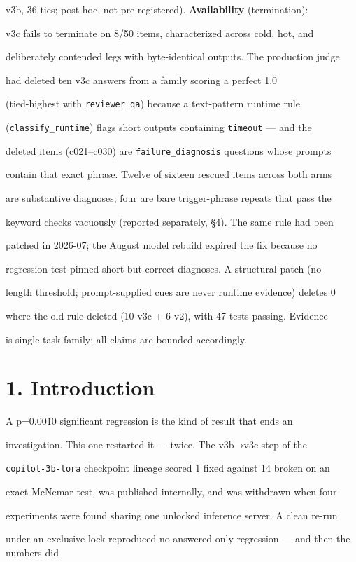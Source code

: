 \documentclass[11pt,a4paper]{article}
\begin{document}
v3b, 36 ties; post-hoc, not pre-registered). \textbf{Availability} (termination):

v3c fails to terminate on 8/50 items, characterized across cold, hot, and

deliberately contended legs with byte-identical outputs. The production judge

had deleted ten v3c answers from a family scoring a perfect 1.0

(tied-highest with \texttt{reviewer\_qa}) because a text-pattern runtime rule

(\texttt{classify\_runtime}) flags short outputs containing \texttt{timeout} — and the

deleted items (c021–c030) are \texttt{failure\_diagnosis} questions whose prompts

contain that exact phrase. Twelve of sixteen rescued items across both arms

are substantive diagnoses; four are bare trigger-phrase repeats that pass the

keyword checks vacuously (reported separately, §4). The same rule had been

patched in 2026-07; the August model rebuild expired the fix because no

regression test pinned short-but-correct diagnoses. A structural patch (no

length threshold; prompt-supplied cues are never runtime evidence) deletes 0

where the old rule deleted (10 v3c + 6 v2), with 47 tests passing. Evidence

is single-task-family; all claims are bounded accordingly.

\section*{1. Introduction}
A p=0.0010 significant regression is the kind of result that ends an

investigation. This one restarted it — twice. The v3b→v3c step of the

\texttt{copilot-3b-lora} checkpoint lineage scored 1 fixed against 14 broken on an

exact McNemar test, was published internally, and was withdrawn when four

experiments were found sharing one unlocked inference server. A clean re-run

under an exclusive lock reproduced no answered-only regression — and then the numbers did
\end{document}
